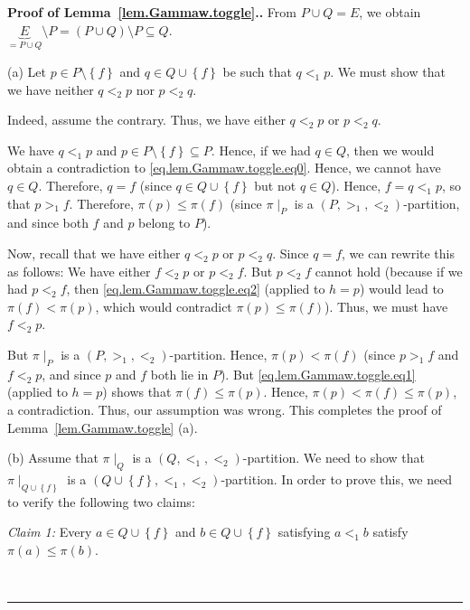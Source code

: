 \documentclass[numbers=enddot,12pt,final,onecolumn,notitlepage,abstracton]{scrartcl}
\theoremstyle{definition}
\newenvironment{proof}[1][Proof]{\noindent\textbf{#1.} }{\ \rule{0.5em}{0.5em}}
\begin{document}
\begin{proof}[Proof of Lemma~\ref{lem.Gammaw.toggle}.]From
$P \cup Q = E$, we obtain $\underbrace{E}_{= P \cup Q}
\setminus P = \left(P \cup Q\right) \setminus P \subseteq Q$.

(a) Let $p \in P \setminus \left\{f\right\}$
and $q \in Q \cup \left\{f\right\}$ be such that
$q <_1 p$. We must show that we have neither $q <_2 p$ nor $p <_2 q$.

Indeed, assume the contrary. Thus, we have
either $q <_2 p$ or $p <_2 q$.

We have $q <_{1} p$ and
$p\in P\setminus\left\{  f\right\}  \subseteq P$. Hence, if we had $q\in Q$,
then we would obtain a contradiction to
\eqref{eq.lem.Gammaw.toggle.eq0}. Hence, we cannot have $q\in Q$.
Therefore, $q=f$ (since $q\in Q\cup\left\{  f\right\}  $ but not $q\in Q$).
Hence, $f=q<_{1}p$, so that $p>_{1}f$. Therefore, $\pi\left(  p\right)
\leq\pi\left(  f\right)  $ (since $\pi\mid_{P}$ is a
$\left(  P,>_{1},<_{2}\right)  $-partition, and since both $f$
and $p$ belong to $P$).

Now, recall that we have either $q <_2 p$ or $p <_2 q$.
Since $q = f$, we can rewrite this as follows:
We have either $f <_2 p$ or $p <_2 f$.
But $p<_{2}f$ cannot hold (because if we had $p<_{2}f$, then
\eqref{eq.lem.Gammaw.toggle.eq2} (applied to $h=p$) would lead to
$\pi\left(  f\right)  <\pi\left(  p\right)  $, which would contradict
$\pi\left(  p\right)  \leq\pi\left(  f\right)  $).
Thus, we must have $f<_{2}p$.

But $\pi\mid_{P}$ is a $\left(  P,>_{1},<_{2}\right)  $-partition. Hence,
$\pi\left(  p\right)  <\pi\left(  f\right)  $ (since $p>_{1}f$ and $f<_{2}p$,
and since $p$ and $f$ both lie in $P$).
But \eqref{eq.lem.Gammaw.toggle.eq1} (applied to $h=p$) shows that
$\pi\left(  f\right)  \leq\pi\left(  p\right)  $. Hence, $\pi\left(  p\right)
<\pi\left(  f\right)  \leq\pi\left(  p\right)  $, a contradiction. Thus, our
assumption was wrong. This completes the proof of
Lemma~\ref{lem.Gammaw.toggle} (a).

(b) Assume that $\pi \mid_Q$ is a $\left(Q, <_1, <_2\right)$-partition. We need
to show that
$\pi \mid_{Q \cup \left\{f\right\}}$ is a
$\left(Q \cup \left\{f\right\}, <_1, <_2\right)$-partition.
In order
to prove this, we need to verify the following two claims:

\textit{Claim 1:} Every $a\in Q\cup\left\{  f\right\}  $ and $b\in
Q\cup\left\{  f\right\}  $ satisfying $a<_{1}b$ satisfy $\pi\left(  a\right)
\leq\pi\left(  b\right)  $.


\end{proof}
\end{document}
